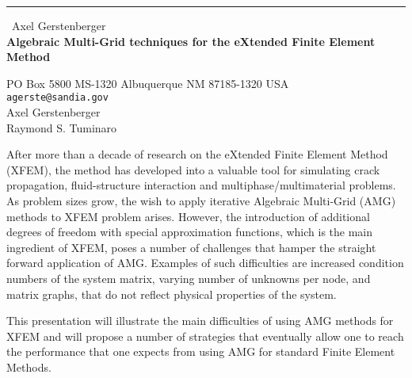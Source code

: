 \documentclass{report}
\begin{document}
\begin{center}
\rule{6in}{1pt} \
{\large Axel Gerstenberger \\
{\bf Algebraic Multi-Grid techniques for the eXtended Finite Element Method }}

PO Box 5800 MS-1320 Albuquerque NM 87185-1320 USA
\\
{\tt agerste@sandia.gov}\\
Axel Gerstenberger\\
Raymond S. Tuminaro\end{center}

After more than a decade of research on the eXtended Finite Element
Method (XFEM), the method has developed into a valuable tool for
simulating crack propagation, fluid-structure interaction and
multiphase/multimaterial problems. As problem sizes grow, the wish to
apply iterative Algebraic Multi-Grid (AMG) methods to XFEM problem
arises. However, the introduction of additional degrees of freedom with
special approximation functions, which is the main ingredient of XFEM,
poses a number of challenges that hamper the straight forward application
of AMG. Examples of such difficulties are increased condition numbers of
the system matrix, varying number of unknowns per node, and matrix
graphs, that do not reflect physical properties of the system.

This presentation will illustrate the main difficulties of using AMG
methods for XFEM and will propose a number of strategies that eventually
allow one to reach the performance that one expects from using AMG for
standard Finite Element Methods.
\end{document}
